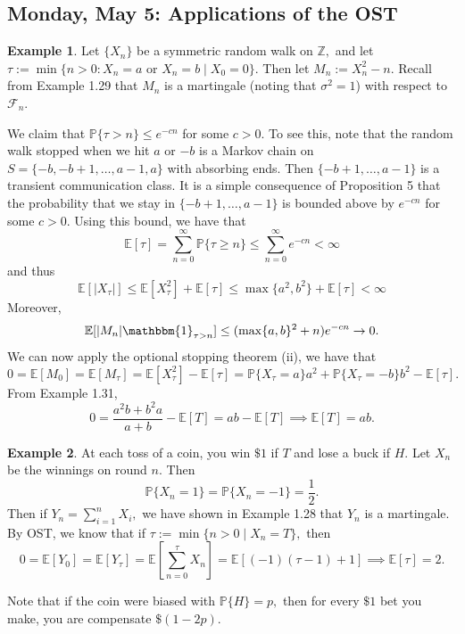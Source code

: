 \documentclass[10pt, oneside]{article}
\newcommand{\bbZ}{\mathbb{Z}}
\newcommand{\bbP}{\mathbb{P}}
\newcommand{\bbE}{\mathbb{E}}
\theoremstyle{definition}
\newtheorem{exmp}{Example}[section]
\begin{document}
\newpage
\subsection{Monday, May 5: Applications of the OST}
\begin{exmp}
    Let $\{X_n\}$ be a symmetric random walk on $\bbZ,$ and let $\tau := \min\{n >0 : X_n = a \text{ or }X_n = b \mid X_0 = 0\}.$ Then let $M_n := X_n^2 - n.$ Recall from Example 1.29 that $M_n$ is a martingale (noting that $\sigma^2 = 1$) with respect to $\mathcal{F}_n.$ 

    We claim that $\bbP\{\tau > n\} \leq e^{-cn}$ for some $c>0.$ To see this, note that the random walk stopped when we hit $a$ or $-b$ is a Markov chain on $S = \{-b, -b + 1, \dots, a-1, a\}$ with absorbing ends. Then $\{-b + 1, \dots, a-1\}$ is a transient communication class. It is a simple consequence of Proposition 5 that the probability that we stay in $\{-b +1, \dots, a-1\}$ is bounded above by $e^{-cn}$ for some $c>0.$ Using this bound, we have that 
    \[\bbE[\tau] = \sum_{n=0}^\infty \bbP\{\tau \geq n\}\leq \sum_{n=0}^\infty e^{-cn} < \infty\] and thus
    \[\bbE[|X_\tau|] \leq \bbE[X_\tau^2] + \bbE[\tau] \leq \max\{a^2, b^2\} + \bbE[\tau] < \infty\]
    Moreover, 
    \[\bbE[|M_n|\mathbbm{1}_{\tau >n}] \leq (\max\{a,b\}^2 + n)e^{-cn} \to 0. \] We can now apply the optional stopping theorem (ii), we have that 
    \[ 0= \bbE[M_0] = \bbE[M_\tau] = \bbE[X_\tau^2] - \bbE[\tau] = \bbP\{X_\tau = a\}a^2+ \bbP\{X_\tau = -b\}b^2 - \bbE[\tau].\] From Example 1.31,
    \[0 = \frac{a^2 b  + b^2 a}{a + b} - \bbE[T] = ab - \bbE[T] \implies \bbE[T] = ab.\]
\end{exmp}


\begin{exmp}
    At each toss of a coin, you win $\$1$ if $T$ and lose a buck if $H$. Let $X_n$ be the winnings on round $n.$ Then 
    \[\bbP\{X_n = 1\} = \bbP\{X_n= -1\} = \frac{1}{2}.\] Then if $Y_n = \sum_{i=1}^n X_i,$ we have shown in Example 1.28 that $Y_n$ is a martingale. By OST, we know that if $\tau:= \min\{n >0 \mid X_n = T\},$ then
    \[0 = \bbE[Y_0] = \bbE[Y_\tau] = \bbE[\sum_{n=0}^\tau X_n] = \bbE[(-1)(\tau-1) + 1] \implies \bbE[\tau] = 2.\]

    Note that if the coin were biased with $\bbP\{H\} = p,$ then for every $\$1$ bet you make, you are compensate $\$(1 - 2p).$
\end{exmp}
\end{document}
